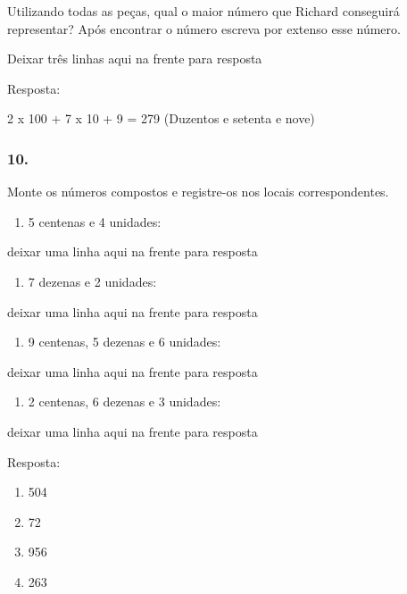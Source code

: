 Utilizando todas as peças, qual o maior número que Richard conseguirá
representar? Após encontrar o número escreva por extenso esse número.

Deixar três linhas aqui na frente para resposta

Resposta:

2 x 100 + 7 x 10 + 9 = 279 (Duzentos e setenta e nove)

\subsubsection{10.}\label{section-9}

Monte os números compostos e registre-os nos locais correspondentes.

\begin{enumerate}
\def\labelenumi{\alph{enumi})}
\item
  5 centenas e 4 unidades:
\end{enumerate}

deixar uma linha aqui na frente para resposta

\begin{enumerate}
\def\labelenumi{\alph{enumi})}
\item
  7 dezenas e 2 unidades:
\end{enumerate}

deixar uma linha aqui na frente para resposta

\begin{enumerate}
\def\labelenumi{\alph{enumi})}
\item
  9 centenas, 5 dezenas e 6 unidades:
\end{enumerate}

deixar uma linha aqui na frente para resposta

\begin{enumerate}
\def\labelenumi{\alph{enumi})}
\item
  2 centenas, 6 dezenas e 3 unidades:
\end{enumerate}

deixar uma linha aqui na frente para resposta

Resposta:

\begin{enumerate}
\def\labelenumi{\alph{enumi})}
\item
  504
\item
  72
\item
  956
\item
  263
\end{enumerate}

